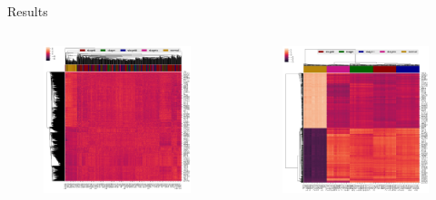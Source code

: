 \documentclass{beamer}
\begin{document}
\begin{frame}{Results}
	\begin{columns}
		\begin{column}{.48\textwidth}
			\begin{figure}[ht]
				\centering
				\includegraphics[width=1\textwidth]{img/original-data-heatmap.png}
				\caption*{\label{fig:original-heatmap}}
			\end{figure}
		\end{column}
		\begin{column}{.48\textwidth}
			\begin{figure}[ht]
				\centering
				\includegraphics[width=1\textwidth]{img/data-aug.png}

\end{figure}
\end{column}
\end{columns}
\end{frame}
\end{document}
